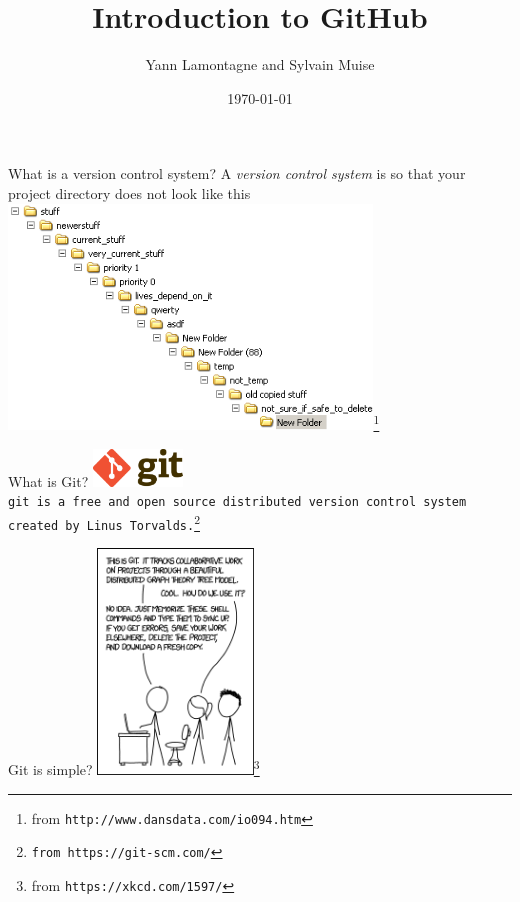 \documentclass[10pt]{beamer}
\title{Introduction to GitHub}
\date{\today}
\author{Yann Lamontagne and Sylvain Muise}
\institute{For PedDay2016 at Dawson College}
\begin{document}
\maketitle

\begin{frame}{What is a version control system?}
A \emph{version control system} is so that your project directory does not look like this\\
\includegraphics[height=6cm]{images/folders.png}\footnote{from \tt{http://www.dansdata.com/io094.htm}}\\
\end{frame}


\begin{frame}{What is Git?}
\includegraphics[height=1cm]{images/git-logo.png}\\
\tt{git} is a free and open source distributed version control system created by Linus Torvalds.\footnote{from \tt{https://git-scm.com/}}
\end{frame}

\begin{frame}{Git is simple?}
\includegraphics[height=6cm]{images/git.png}\footnote{from \tt{https://xkcd.com/1597/}}\\
\end{frame}
\end{document}
